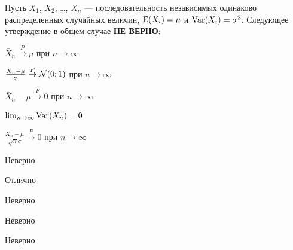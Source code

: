 
\begin{question}
Пусть \(X_1\), \(X_2\), \ldots, \(X_n\) --- последовательность
независимых одинаково распределенных случайных величин, \(\operatorname{E}(X_i)=\mu\)
и \(\operatorname{Var}(X_i)=\sigma^2\). Следующее утверждение в общем случае
\textbf{НЕ ВЕРНО}:
\begin{answerlist}
  \item \(\bar{X}_n \overset{P}{\to} \mu\) при \(n\to\infty\)
  \item \(\frac{X_n-\mu}{\sigma} \overset{F}{\to} \mathcal{N}(0;1)\) при \(n\to\infty\)
  \item \(\bar{X}_n-\mu \overset{F}{\to } 0\) при \(n\to\infty\)
  \item \(\lim_{n\to\infty} \operatorname{Var}(\bar{X}_n)=0\)
  \item \(\frac{\bar{X}_n-\mu}{\sqrt{n} \sigma } \overset{P}{\to } 0\) при
\(n\to\infty\)
\end{answerlist}
\end{question}

\begin{solution}
\begin{answerlist}
  \item Неверно
  \item Отлично
  \item Неверно
  \item Неверно
  \item Неверно
\end{answerlist}
\end{solution}


